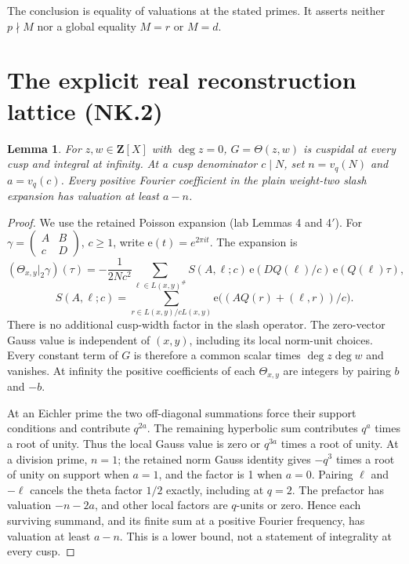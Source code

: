 \documentclass[11pt]{article}
\newcommand{\Z}{\mathbf Z}
\newtheorem{lemma}{Lemma}
\begin{document}
The conclusion is equality of valuations at the stated primes. It
asserts neither $p\nmid M$ nor a global equality $M=r$ or $M=d$.

\section{The explicit real reconstruction lattice (NK.2)}
\begin{lemma}\label{cusps}
For $z,w\in\Z[X]$ with $\deg z=0$, $G=\Theta(z,w)$ is cuspidal at every
cusp and integral at infinity. At a cusp denominator $c\mid N$, set
$n=v_q(N)$ and $a=v_q(c)$. Every positive Fourier coefficient in the
plain weight-two slash expansion has valuation at least $a-n$.
\end{lemma}
\begin{proof}
We use the retained Poisson expansion (lab Lemmas 4 and 4$'$). For
$\gamma=\left(\begin{smallmatrix}A&B\\c&D\end{smallmatrix}\right)$,
$c\ge1$, write $\mathrm e(t)=e^{2\pi it}$. The expansion is
\[
 (\Theta_{x,y}|_2\gamma)(\tau)
 =-\frac1{2Nc^2}\sum_{\ell\in L(x,y)^\#}
 S(A,\ell;c)\,\mathrm e(DQ(\ell)/c)\,\mathrm e(Q(\ell)\tau),
\]
\[
 S(A,\ell;c)=\sum_{r\in L(x,y)/cL(x,y)}
       \mathrm e\bigl((AQ(r)+(\ell,r))/c\bigr).
\]
There is no additional cusp-width factor in the slash operator.
The zero-vector Gauss value is independent of $(x,y)$, including its
local norm-unit choices. Every constant term of $G$ is therefore a
common scalar times $\deg z\deg w$ and vanishes. At infinity the
positive coefficients of each $\Theta_{x,y}$ are integers by pairing
$b$ and $-b$.

At an Eichler prime the two off-diagonal summations force their support
conditions and contribute $q^{2a}$. The remaining hyperbolic sum
contributes $q^a$ times a root of unity. Thus the local Gauss value is
zero or $q^{3a}$ times a root of unity. At a division prime, $n=1$;
the retained norm Gauss identity gives $-q^3$ times a root of unity on
support when $a=1$, and the factor is 1 when $a=0$. Pairing $\ell$
and $-\ell$ cancels the theta factor $1/2$ exactly, including at $q=2$.
The prefactor has valuation $-n-2a$, and other local factors are
$q$-units or zero. Hence each surviving summand, and its finite sum
at a positive Fourier frequency, has valuation at least $a-n$.
This is a lower bound, not a statement of integrality at every cusp.
\end{proof}
\end{document}
